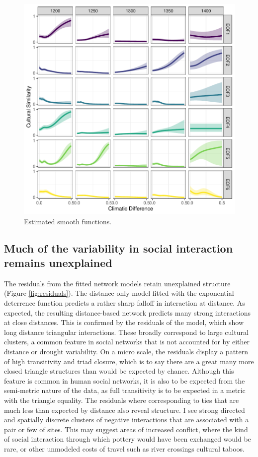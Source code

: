 \documentclass[11pt]{wlscirep}
\begin{document}
\begin{figure}[!htbp]
\centering
\includegraphics[width=.9\linewidth]{figures/smooths.pdf}
\caption{Estimated smooth functions.}
\label{fig:smooths}
\end{figure}

\subsection*{Much of the variability in social interaction remains unexplained}

The residuals from the fitted network models retain unexplained structure (Figure \ref{fig:residuals}). The distance-only model fitted with the exponential deterrence function predicts a rather sharp falloff in interaction at distance. As expected, the resulting distance-based network predicts many strong interactions at close distances. This is confirmed by the residuals of the model, which show long distance triangular interactions. These broadly correspond to large cultural clusters, a common feature in social networks that is not accounted for by either distance or drought variability. On a micro scale, the residuals display a pattern of high transitivity and triad closure, which is to say there are a great many more closed triangle structures than would be expected by chance. Although this feature is common in human social networks, it is also to be expected from the semi-metric nature of the data, as full transitivity is to be expected in a metric with the triangle equality. The residuals where corresponding to ties that are much less than expected by distance also reveal structure. I see strong directed and spatially discrete clusters of negative interactions that are associated with a pair or few of sites. This may suggest areas of increased conflict, where the kind of social interaction through which pottery would have been exchanged would be rare, or other unmodeled costs of travel such as river crossings cultural taboos. 
\end{document}
